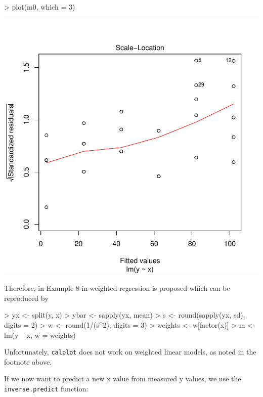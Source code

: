 \documentclass[a4paper]{article}
\begin{document}
\begin{Schunk}
\begin{Sinput}
> plot(m0, which = 3)
\end{Sinput}
\end{Schunk}
\includegraphics{chemCal-002}

Therefore, in Example 8 in \cite{massart97} weighted regression
is proposed which can be reproduced by

\begin{Schunk}
\begin{Sinput}
> yx <- split(y, x)
> ybar <- sapply(yx, mean)
> s <- round(sapply(yx, sd), digits = 2)
> w <- round(1/(s^2), digits = 3)
> weights <- w[factor(x)]
> m <- lm(y ~ x, w = weights)
\end{Sinput}
\end{Schunk}

Unfortunately, \texttt{calplot} does not work on weighted linear models,
as noted in the footnote above.

If we now want to predict a new x value from measured y values,
we use the \texttt{inverse.predict} function:
\end{document}
